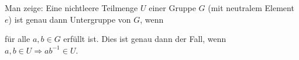 \documentclass[a4paper, 12pt, margins=3cm]{homework}
\begin{document}
  \begin{problem}
    Man zeige: Eine nichtleere Teilmenge $U$ einer Gruppe $G$ (mit neutralem Element
    $e$) ist genau dann Untergruppe von $G$, wenn \\
    für alle $a,b\in G$ erfüllt ist. Dies ist genau dann der Fall, wenn
    $a,b\in U \Rightarrow ab^{-1}\in U$.
  \end{problem}
  \begin{solution}
    
  \end{solution}

\newpage
\end{document}
